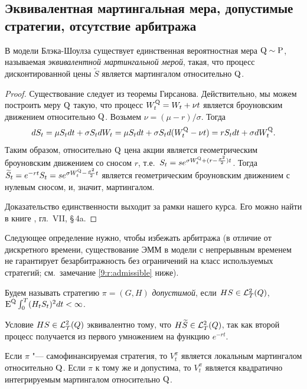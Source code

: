 \subsection{Эквивалентная мартингальная мера, допустимые стратегии, отсутствие арбитража}

\begin{theorem}
\label{9:t:emm}
В модели Блэка-Шоулза существует единственная вероятностная мера $\mathrm{Q}\sim\mathrm{P}$, называемая \emph{эквивалентной мартингальной мерой}, такая, что процесс дисконтированной цены $\tilde S$ является мартингалом относительно $\mathrm{Q}$.
\end{theorem}

\begin{proof}
Существование следует из теоремы Гирсанова.
Действительно, мы можем построить меру $\mathrm{Q}$ такую, что процесс $W_t^{\mathrm{Q}} = W_t + \nu t$ является броуновским движением относительно $\mathrm{Q}$.
Возьмем $\nu=(\mu-r)/\sigma$.
Тогда
\[
dS_t = \mu S_t dt + \sigma S_t dW_t = \mu S_t dt + \sigma S_t d(W_t^{\mathrm{Q}} - \nu t) = r S_t dt + \sigma dW_t^{\mathrm{Q}}.
\]
Таким образом, относительно $\mathrm{Q}$ цена акции является геометрическим броуновским движением со сносом $r$, т.е.\ $S_t = s e^{\sigma W_t^{\mathrm{Q}} + (r-\frac{\sigma^2}{2})t}$.
Тогда $\widetilde S_t = e^{-rt}S_t = s e^{\sigma W_t^{\mathrm{Q}} -\frac{\sigma^2}{2}t}$ является геометрическим броуновским движением с нулевым сносом, и, значит, мартингалом.

Доказательство единственности выходит за рамки нашего курса.
Его можно найти в книге \cite{Shiryaev98}, гл.~VII, \S\,4a.
\end{proof}

Следующее определение нужно, чтобы избежать арбитража (в отличие от дискретного времени, существование ЭММ в модели с непрерывным временем не гарантирует безарбитражность без ограничений на класс используемых стратегий; см.~замечание \ref{9:r:admissible} ниже).

\begin{definition}
\label{9:d:admissible}
Будем называть стратегию $\pi=(G,H)$ \emph{допустимой}, если $HS \in \mathcal{L}_T^2(Q)$, \te\ $\operatorname{E}^{\mathrm{Q}} \int_0^T (H_tS_t)^2 dt < \infty$.
\end{definition} 

\begin{remark}
Условие $HS \in \mathcal{L}_T^2(Q)$ эквивалентно тому, что $H\widetilde S \in \mathcal{L}_T^2(Q)$, так как второй процесс получается из первого умножением на функцию $e^{-rt}$.
\end{remark}

\begin{proposition}
\label{9:p:admissible}
Если $\pi$ "--- самофинансируемая стратегия, то $V_t^\pi$ является локальным мартингалом относительно $\mathrm{Q}$. Если $\pi$ к тому же и допустима, то $V_t^\pi$  является квадратично интегрируемым мартингалом относительно $\mathrm{Q}$.
\end{proposition}

